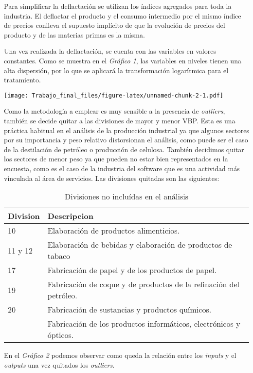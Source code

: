 \documentclass[
]{article}
\begin{document}
Para simplificar la deflactación se utilizan los índices agregados para
toda la industria. El deflactar el producto y el consumo intermedio por
el mismo índice de precios conlleva el supuesto implícito de que la
evolución de precios del producto y de las materias primas es la misma.

Una vez realizada la deflactación, se cuenta con las variables en
valores constantes. Como se muestra en el \emph{Gráfico 1}, las
variables en niveles tienen una alta dispersión, por lo que se aplicará
la transformación logarítmica para el tratamiento.

\texttt{[image: Trabajo\_final\_files/figure-latex/unnamed-chunk-2-1.pdf]}

Como la metodología a emplear es muy sensible a la presencia de
\emph{outliers}, también se decide quitar a las divisiones de mayor y
menor VBP. Esta es una práctica habitual en el análisis de la producción
industrial ya que algunos sectores por su importancia y peso relativo
distorsionan el análisis, como puede ser el caso de la destilación de
petróleo o producción de celulosa. También decidimos quitar los sectores
de menor peso ya que pueden no estar bien representados en la encuesta,
como es el caso de la industria del software que es una actividad más
vinculada al área de servicios. Las divisiones quitadas son las
siguientes:

\begin{table}[H]

\caption{\label{tab:unnamed-chunk-3}Divisiones no incluídas en el análisis}
\centering
\begin{tabular}[t]{ll}
\toprule
Division & Descripcion\\
\midrule
\rowcolor{gray!6}  10 & Elaboración de productos alimenticios.\\
11 y 12 & Elaboración de bebidas y elaboración de productos de tabaco\\
\rowcolor{gray!6}  17 & Fabricación de papel y de los productos de papel.\\
19 & Fabricación de coque y de productos de la refinación del petróleo.\\
\rowcolor{gray!6}  20 & Fabricación de sustancias y productos químicos.\\
\addlinespace
26 & Fabricación de los productos informáticos, electrónicos y ópticos.\\
\bottomrule
\end{tabular}
\end{table}

En el \emph{Gráfico 2} podemos observar como queda la relación entre los
\emph{inputs} y el \emph{outputs} una vez quitados los \emph{outliers}.
\end{document}
